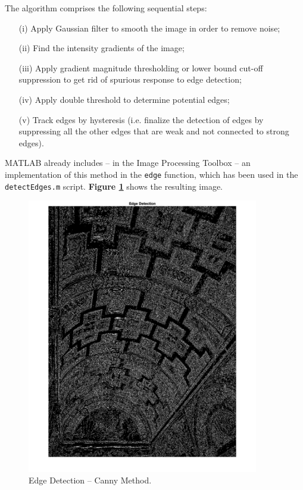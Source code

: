 \documentclass[12pt,a4paper]{article}
\begin{document}
The algorithm comprises the following sequential steps:
\begin{itemize}
    \item[(i)] Apply Gaussian filter to smooth the image in order to remove noise;
    \item[(ii)] Find the intensity gradients of the image;
    \item[(iii)] Apply gradient magnitude thresholding or lower bound cut-off suppression to get rid of spurious response to edge detection;
    \item[(iv)] Apply double threshold to determine potential edges;
    \item[(v)] Track edges by hysteresis (i.e. finalize the detection of edges by suppressing all the other edges that are weak and not connected to strong edges).
\end{itemize}
\bigskip
MATLAB already includes -- in the Image Processing Toolbox -- an implementation of this method in the \verb|edge| function, which has been used in the \verb|detectEdges.m| script. \textbf{Figure \ref{fig:edges}} shows the resulting image.

\begin{figure}[H]
    \centering
    \includegraphics[width=0.9\textwidth]{Images/PalazzoTe_edges.png}
    \caption[Edge Detection -- Canny Method.]{Edge Detection -- Canny Method.}
    \label{fig:edges}
\end{figure}
\end{document}
